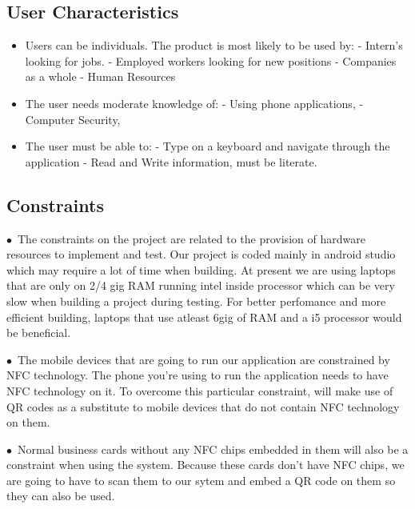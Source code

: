 \documentclass[english]{article}
\begin{document}
				\subsection{User Characteristics}
				\begin{itemize}
					\item
					Users can be individuals. The product is most likely to be used by:
					\subitem
					- Intern's looking for jobs.
					\subitem
					- Employed workers looking for new positions
					\subitem
					- Companies as a whole
					\subitem
					- Human Resources
					\item 
					The user needs moderate knowledge of:
					\subitem 
					- Using phone applications, 
					\subitem 
					- Computer Security,  
					\item 
					The user must be able to: 
					\subitem
					- Type on a keyboard and navigate through the application
					\subitem
					- Read and Write information, must be literate.
					
				\end{itemize}
				
			
				\subsection{Constraints}
            
				
				$\bullet$\  The constraints on the project are related to the provision of hardware resources to implement and test. Our project is coded mainly in android studio which may require a lot of time when building. At present we are using laptops                                 				that are only on 2/4 gig RAM running intel inside processor which can be very slow when building a project during testing. For better perfomance and more efficient building, laptops that use atleast 6gig of RAM and a i5 processor would be 							beneficial.\par

                                	$\bullet$\ The mobile devices that are going to run our application are constrained by NFC technology. The phone you're using to run the application needs to have NFC technology on it. To overcome this particular constraint, will make use of QR codes 					as a substitute to mobile devices that do not contain NFC technology on them. 

                                	$\bullet$\ Normal business cards without any NFC chips embedded in them will also be a constraint when using the system. Because these cards don't have NFC chips, we are going to have  to scan them to our sytem and embed a QR code on them so 					they can also be used.
\end{document}
